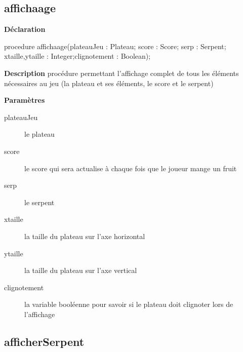 \documentclass{report}
\newif\ifpdf
\begin{document}
\subsection*{affichaage}
\fi
\label{Affichage-affichaage}
\begin{list}{}{
\setlength{\itemindent}{0cm}
\setlength{\listparindent}{0cm}
\setlength{\leftmargin}{\evensidemargin}
\addtolength{\leftmargin}{\tmplength}
\settowidth{\labelsep}{X}
\addtolength{\leftmargin}{\labelsep}
\setlength{\labelwidth}{\tmplength}
}
\item[\textbf{Déclaration}\hfill]
\ifpdf
\begin{flushleft}
\fi
\begin{ttfamily}
procedure affichaage(plateauJeu : Plateau; score : Score; serp : Serpent; xtaille,ytaille : Integer;clignotement : Boolean);\end{ttfamily}

\ifpdf
\end{flushleft}
\fi

\par
\item[\textbf{Description}]
procédure permettant l'affichage complet de tous les éléments nécessaires au jeu (la plateau et ses éléments, le score et le serpent)      \par
\item[\textbf{Paramètres}]
\begin{description}
\item[plateauJeu] le plateau
\item[score] le score qui sera actualise à chaque fois que le joueur mange un fruit
\item[serp] le serpent
\item[xtaille] la taille du plateau sur l'axe horizontal
\item[ytaille] la taille du plateau sur l'axe vertical
\item[clignotement] la variable booléenne pour savoir si le plateau doit clignoter lors de l'affichage
\end{description}


\end{list}
\ifpdf
\subsection*{\large{\textbf{afficherSerpent}}\normalsize\hspace{1ex}\hrulefill}
\else
\end{document}
